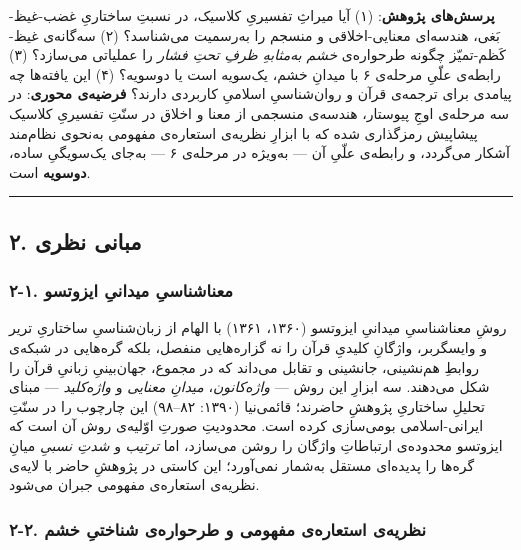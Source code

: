 \begin{RTL}
\begin{otherlanguage}{persian}
\textbf{پرسش‌های پژوهش}: (۱) آیا میراثِ تفسیریِ کلاسیک، در نسبتِ ساختاریِ
غضب-غیظ-بَغی، هندسه‌ای معنایی-اخلاقی و منسجم را به‌رسمیت می‌شناسد؟ (۲)
سه‌گانه‌ی غیظ-کَظم-تمیّز چگونه طرحواره‌ی \emph{خشم به‌مثابهِ ظرفِ تحتِ فشار} را
عملیاتی می‌سازد؟ (۳) رابطه‌ی علّیِ مرحله‌ی ۶ با میدانِ خشم، یک‌سویه است یا
دوسویه؟ (۴) این یافته‌ها چه پیامدی برای ترجمه‌ی قرآن و روان‌شناسیِ اسلامیِ
کاربردی دارند؟ \textbf{فرضیه‌ی محوری}: در سه مرحله‌ی اوجِ پیوستار، هندسه‌ی
منسجمی از معنا و اخلاق در سنّتِ تفسیریِ کلاسیک پیشاپیش رمزگذاری شده که با
ابزارِ نظریه‌ی استعاره‌ی مفهومی به‌نحوی نظام‌مند آشکار می‌گردد، و رابطه‌ی علّیِ
آن --- به‌ویژه در مرحله‌ی ۶ --- به‌جای یک‌سویگیِ ساده، \textbf{دوسویه} است.

\begin{center}\rule{0.5\linewidth}{0.5pt}\end{center}

\subsection{۲. مبانی
نظری}\label{ux645ux628ux627ux646ux6cc-ux646ux638ux631ux6cc}

\subsubsection{۲-۱. معناشناسیِ میدانیِ
ایزوتسو}\label{ux645ux639ux646ux627ux634ux646ux627ux633ux6cc-ux645ux6ccux62fux627ux646ux6cc-ux627ux6ccux632ux648ux62aux633ux648}

روشِ معناشناسیِ میدانیِ ایزوتسو (۱۳۶۰، ۱۳۶۱) با الهام از زبان‌شناسیِ ساختاریِ
تریر و وایسگربر، واژگانِ کلیدیِ قرآن را نه گزاره‌هایی منفصل، بلکه گره‌هایی
در شبکه‌ی روابطِ هم‌نشینی، جانشینی و تقابل می‌داند که در مجموع، جهان‌بینیِ
زبانیِ قرآن را شکل می‌دهند. سه ابزارِ این روش --- \emph{واژه‌کانون}،
\emph{میدانِ معنایی} و \emph{واژه‌کلید} --- مبنای تحلیلِ ساختاریِ پژوهشِ
حاضرند؛ قائمی‌نیا (۱۳۹۰: ۸۲--۹۸) این چارچوب را در سنّتِ ایرانی-اسلامی
بومی‌سازی کرده است. محدودیتِ صورتِ اوّلیه‌ی روش آن است که ایزوتسو محدوده‌ی
ارتباطاتِ واژگان را روشن می‌سازد، اما \emph{ترتیب} و \emph{شدتِ نسبیِ} میانِ
گره‌ها را پدیده‌ای مستقل به‌شمار نمی‌آورد؛ این کاستی در پژوهشِ حاضر با لایه‌ی
نظریه‌ی استعاره‌ی مفهومی جبران می‌شود.

\subsubsection{۲-۲. نظریه‌ی استعاره‌ی مفهومی و طرحواره‌ی شناختیِ
خشم}\label{ux646ux638ux631ux6ccux647ux6cc-ux627ux633ux62aux639ux627ux631ux647ux6cc-ux645ux641ux647ux648ux645ux6cc-ux648-ux637ux631ux62dux648ux627ux631ux647ux6cc-ux634ux646ux627ux62eux62aux6cc-ux62eux634ux645}


\end{otherlanguage}
\end{RTL}
